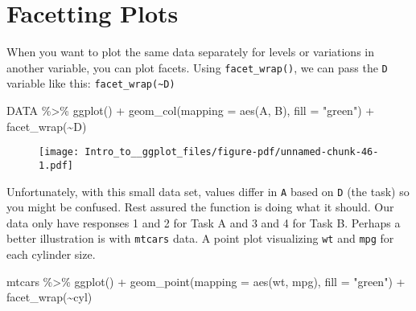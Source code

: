 \documentclass[
  letterpaper,
  DIV=11,
  numbers=noendperiod]{scrartcl}
\newenvironment{Shaded}{\begin{snugshade}}{\end{snugshade}}
\newcommand{\AttributeTok}[1]{\textcolor[rgb]{0.40,0.45,0.13}{#1}}
\newcommand{\FunctionTok}[1]{\textcolor[rgb]{0.28,0.35,0.67}{#1}}
\newcommand{\NormalTok}[1]{\textcolor[rgb]{0.00,0.23,0.31}{#1}}
\newcommand{\SpecialCharTok}[1]{\textcolor[rgb]{0.37,0.37,0.37}{#1}}
\newcommand{\StringTok}[1]{\textcolor[rgb]{0.13,0.47,0.30}{#1}}
\begin{document}
\hypertarget{facetting-plots}{%
\section{\texorpdfstring{\textbf{Facetting
Plots}}{Facetting Plots}}\label{facetting-plots}}

When you want to plot the same data separately for levels or variations
in another variable, you can plot facets. Using \texttt{facet\_wrap()},
we can pass the \texttt{D} variable like this:
\texttt{facet\_wrap(\textasciitilde{}D)}

\begin{Shaded}
\begin{Highlighting}[]
\NormalTok{DATA }\SpecialCharTok{\%\textgreater{}\%}
  \FunctionTok{ggplot}\NormalTok{() }\SpecialCharTok{+}
  \FunctionTok{geom\_col}\NormalTok{(}\AttributeTok{mapping =} \FunctionTok{aes}\NormalTok{(A, B),}
           \AttributeTok{fill =} \StringTok{"green"}\NormalTok{) }\SpecialCharTok{+}
  \FunctionTok{facet\_wrap}\NormalTok{(}\SpecialCharTok{\textasciitilde{}}\NormalTok{D)}
\end{Highlighting}
\end{Shaded}

\begin{figure}[H]

{\centering \texttt{[image: Intro\_to\_\_ggplot\_files/figure-pdf/unnamed-chunk-46-1.pdf]}

}

\end{figure}

Unfortunately, with this small data set, values differ in \texttt{A}
based on \texttt{D} (the task) so you might be confused. Rest assured
the function is doing what it should. Our data only have responses 1 and
2 for Task A and 3 and 4 for Task B. Perhaps a better illustration is
with \texttt{mtcars} data. A point plot visualizing \texttt{wt} and
\texttt{mpg} for each cylinder size.

\begin{Shaded}
\begin{Highlighting}[]
\NormalTok{mtcars }\SpecialCharTok{\%\textgreater{}\%}
  \FunctionTok{ggplot}\NormalTok{() }\SpecialCharTok{+}
  \FunctionTok{geom\_point}\NormalTok{(}\AttributeTok{mapping =} \FunctionTok{aes}\NormalTok{(wt, mpg),}
             \AttributeTok{fill =} \StringTok{"green"}\NormalTok{) }\SpecialCharTok{+}
  \FunctionTok{facet\_wrap}\NormalTok{(}\SpecialCharTok{\textasciitilde{}}\NormalTok{cyl)}
\end{Highlighting}
\end{Shaded}
\end{document}
